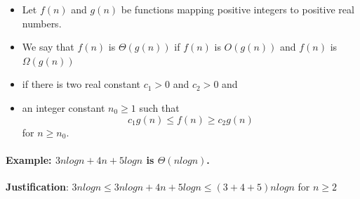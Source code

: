 \documentclass[11pt]{article}
\makeatletter
\providecommand{\tightlist}{%
      \setlength{\itemsep}{0pt}\setlength{\parskip}{0pt}}
\newcommand{\boxspacing}{\kern\kvtcb@left@rule\kern\kvtcb@boxsep}
\newcommand{\prompt}[4]{
        \ttfamily\llap{{\color{#2}[#3]:\hspace{3pt}#4}}\vspace{-\baselineskip}
    }
\makeatother
\begin{document}
\begin{itemize}
\tightlist
\item
  Let \(f(n)\) and \(g(n)\) be functions mapping positive integers to
  positive real numbers.
\item
  We say that \(f(n)\) is \(\Theta(g(n))\) if \(f(n)\) is \(O(g(n))\)
  and \(f(n)\) is \(\Omega(g(n))\)
\item
  if there is two real constant \(c_1 > 0\) and \(c_2 > 0\) and
\item
  an integer constant \(n_0 \ge 1\) such that \[
  c_1g(n) \le f(n)\ge c_2g(n) 
  \] for \(n\ge n_0\).
\end{itemize}

    \hypertarget{example-3nlogn4n5logn-is-thetanlogn.}{%
\paragraph{\texorpdfstring{Example: \(3nlogn+4n+5logn\) is
\(\Theta(nlogn)\).}{Example: 3nlogn+4n+5logn is \textbackslash Theta(nlogn).}}\label{example-3nlogn4n5logn-is-thetanlogn.}}

\textbf{Justification}: \(3nlogn \le 3nlogn+4n+5logn \le (3+4+5)nlogn\)
for \(n \ge 2\)

    \begin{tcolorbox}[breakable, size=fbox, boxrule=1pt, pad at break*=1mm,colback=cellbackground, colframe=cellborder]
\prompt{In}{incolor}{ }{\boxspacing}
\begin{Verbatim}[commandchars=\\\{\}]

\end{Verbatim}
\end{tcolorbox}


    
    
    
\end{document}
